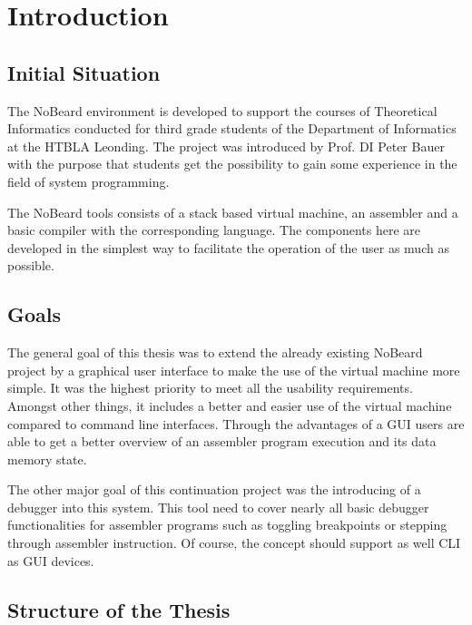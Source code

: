 \chapter{Introduction}
\section{Initial Situation}
The NoBeard environment is developed to support the courses of Theoretical Informatics conducted for third grade students of the Department of Informatics at the HTBLA Leonding. The project was introduced by Prof. DI Peter Bauer with the purpose that students get the possibility to gain some experience in the field of system programming. 

The NoBeard tools consists of a stack based virtual machine, an assembler and a basic compiler with the corresponding language. The components here are developed in the simplest way  to facilitate the operation of the user as much as possible.

\section{Goals}
The general goal of this thesis was to extend the already existing NoBeard project by a graphical user interface to make the use of the virtual machine more simple. It was the highest priority to meet all the usability requirements. Amongst other things, it includes a better and easier use of the virtual machine compared to command line interfaces. Through the advantages of a GUI users are able to get a better overview of an assembler program execution and its data memory state.

The other major goal of this continuation project was the introducing of a debugger into this system. This tool need to cover nearly all basic debugger functionalities for assembler programs such as toggling breakpoints or stepping through assembler instruction. Of course, the concept should support as well CLI as GUI devices.

\section{Structure of the Thesis}

